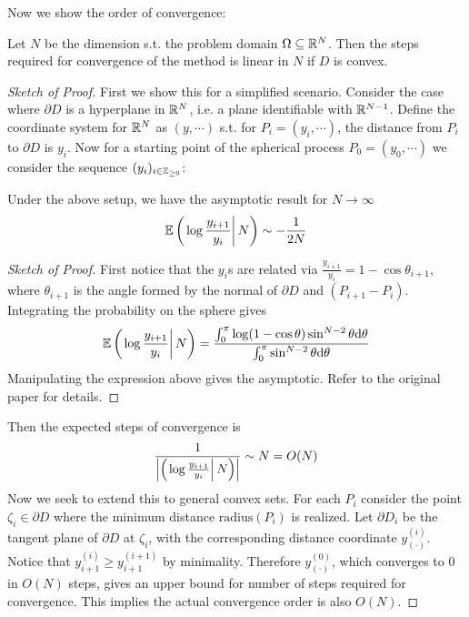 \documentclass[10pt]{article}
\begin{document}
\textstart
Now we show the order of convergence:

\begin{theorem}
    Let $N$ be the dimension s.t. the problem domain $\Omega \subseteq \mathbb{R}^N$. Then the steps required for convergence of the method is linear in $N$ if $D$ is convex. 
\end{theorem}

\begin{proof}[Sketch of Proof]
    First we show this for a simplified scenario. Consider the case where $\partial D$ is a hyperplane in $\mathbb{R}^N$, i.e. a plane identifiable with $\mathbb{R}^{N - 1}$. Define the coordinate system for $\mathbb{R}^N$ as $(y, \cdots)$ s.t. for $P_i = (y_i, \cdots)$, the distance from $P_i$ to $\partial D$ is $y_i$. Now for a starting point of the spherical process $P_0 = (y_0, \cdots)$ we consider the sequence $(y_i)_{i \in \mathbb{Z}_{\geq 0}}$:

    \begin{paraindent}
        \begin{lemma}
            Under the above setup, we have the asymptotic result for $N \to \infty$
            \[
                \mathbb{E}\left( \left. \log \frac{y_{i+1}}{y_i} \right| N \right) \sim -\frac{1}{2N}
            \]
        \end{lemma}

        \begin{proof}[Sketch of Proof]
            First notice that the $y_{i}$s are related via $\frac{y_{i+1}}{y_i} = 1 - \cos \theta_{i+1}$, where $\theta_{i+1}$ is the angle formed by the normal of $\partial D$ and $(P_{i+1} - P_i)$. Integrating the probability on the sphere gives
            \[
                \mathbb{E}\left( \left. \log \frac{y_{i+1}}{y_i} \right| N \right) = \frac{\int_{0}^{\pi} \log (1 - \cos \theta) \sin^{N-2} \theta \mathrm{d} \theta}{\int_0^{\pi} \sin^{N-2} \theta \mathrm{d} \theta}
            \]
            Manipulating the expression above gives the asymptotic. Refer to the original paper for details.
        \end{proof}
    \end{paraindent}

    Then the expected steps of convergence is 
    \[
        \frac{1}{ \left|\left( \left. \log \frac{y_{i+1}}{y_i} \right| N \right)\right|} \sim N = O(N) 
    \]
    Now we seek to extend this to general convex sets. For each $P_i$ consider the point $\zeta_i \in \partial D$ where the minimum distance $\text{radius}(P_i)$ is realized. Let $\partial D_i$ be the tangent plane of $\partial D$ at $\zeta_i$, with the corresponding distance coordinate $y_{(\cdot)}^{(i)}$. Notice that $y_{i+1}^{(i)} \geq y_{i+1}^{(i+1)}$ by minimality. Therefore $y_{(\cdot)}^{(0)}$, which converges to 0 in $O(N)$ steps, gives an upper bound for number of steps required for convergence. This implies the actual convergence order is also $O(N)$. 
\end{proof}
\end{document}
